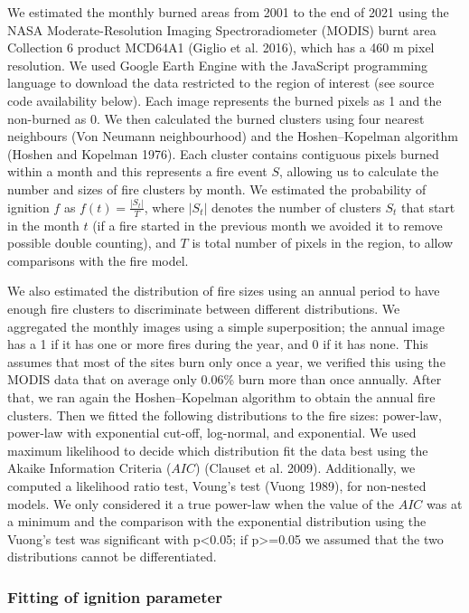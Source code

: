 \documentclass[
]{article}
\begin{document}
We estimated the monthly burned areas from 2001 to the end of 2021 using
the NASA Moderate-Resolution Imaging Spectroradiometer (MODIS) burnt
area Collection 6 product MCD64A1 (Giglio et al. 2016), which has a 460
m pixel resolution. We used Google Earth Engine with the JavaScript
programming language to download the data restricted to the region of
interest (see source code availability below). Each image represents the
burned pixels as 1 and the non-burned as 0. We then calculated the
burned clusters using four nearest neighbours (Von Neumann
neighbourhood) and the Hoshen--Kopelman algorithm (Hoshen and Kopelman
1976). Each cluster contains contiguous pixels burned within a month and
this represents a fire event \(S\), allowing us to calculate the number
and sizes of fire clusters by month. We estimated the probability of
ignition \(f\) as \(f(t) = \frac{|S_t|}{T}\), where \(|S_t|\) denotes
the number of clusters \(S_t\) that start in the month \(t\) (if a fire
started in the previous month we avoided it to remove possible double
counting), and \(T\) is total number of pixels in the region, to allow
comparisons with the fire model.

We also estimated the distribution of fire sizes using an annual period
to have enough fire clusters to discriminate between different
distributions. We aggregated the monthly images using a simple
superposition; the annual image has a 1 if it has one or more fires
during the year, and 0 if it has none. This assumes that most of the
sites burn only once a year, we verified this using the MODIS data that
on average only 0.06\% burn more than once annually. After that, we ran
again the Hoshen--Kopelman algorithm to obtain the annual fire clusters.
Then we fitted the following distributions to the fire sizes: power-law,
power-law with exponential cut-off, log-normal, and exponential. We used
maximum likelihood to decide which distribution fit the data best using
the Akaike Information Criteria (\(AIC\)) (Clauset et al. 2009).
Additionally, we computed a likelihood ratio test, Voung's test (Vuong
1989), for non-nested models. We only considered it a true power-law
when the value of the \(AIC\) was at a minimum and the comparison with
the exponential distribution using the Vuong's test was significant with
p\textless0.05; if p\textgreater=0.05 we assumed that the two
distributions cannot be differentiated.

\subsubsection{Fitting of ignition
parameter}\label{fitting-of-ignition-parameter}
\end{document}
